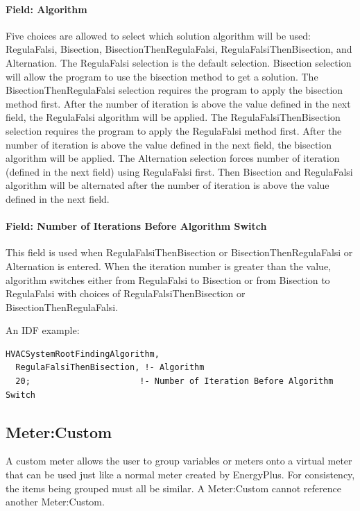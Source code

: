 \paragraph{Field: Algorithm}\label{field-algorithm-201710020807}

Five choices are allowed to select which solution algorithm will be used: RegulaFalsi, Bisection,  BisectionThenRegulaFalsi, RegulaFalsiThenBisection, and Alternation. The RegulaFalsi
selection is the default selection. Bisection selection will allow the program to use the bisection method to get a solution. The BisectionThenRegulaFalsi selection requires the program to apply the bisection method first. After the number of iteration is above the value defined in the next field, the RegulaFalsi algorithm will be applied. The RegulaFalsiThenBisection selection requires the program to apply the RegulaFalsi method first. After the number of iteration is above the value defined in the next field, the bisection algorithm will be applied. The Alternation selection forces number of iteration (defined in the next field) using RegulaFalsi first. Then Bisection and RegulaFalsi algorithm will be alternated after the number of iteration is above the value defined in the next field.


\paragraph{Field: Number of Iterations Before Algorithm Switch}\label{field-number-of-iteration-before-algorithm-switch}

This field is used when RegulaFalsiThenBisection or BisectionThenRegulaFalsi or Alternation is entered. When the iteration number is greater than the value, algorithm switches either from RegulaFalsi to Bisection or from Bisection to RegulaFalsi with choices of RegulaFalsiThenBisection or BisectionThenRegulaFalsi.

An IDF example:

\begin{lstlisting}
HVACSystemRootFindingAlgorithm,
  RegulaFalsiThenBisection, !- Algorithm
  20;                      !- Number of Iteration Before Algorithm Switch
\end{lstlisting}

\subsection{Meter:Custom}\label{metercustom}

A custom meter allows the user to group variables or meters onto a virtual meter that can be used just like a normal meter created by EnergyPlus. For consistency, the items being grouped must all be similar. A Meter:Custom cannot reference another Meter:Custom.

